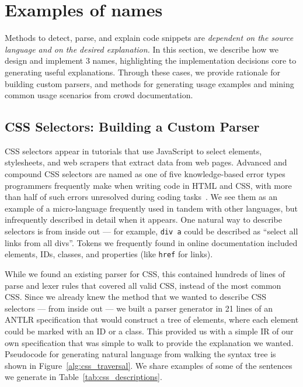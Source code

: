 \section{Examples of \Glspl{name}}

Methods to detect, parse, and explain code snippets are \emph{dependent on the source language and on the desired explanation.}
In this section, we describe how we design and implement 3 \glspl{name}, highlighting the implementation decisions core to generating useful explanations.
Through these cases, we provide rationale for building custom parsers, and methods for generating usage examples and mining common usage scenarios from crowd documentation.

\subsection{CSS Selectors: Building a Custom Parser}

CSS selectors appear in tutorials that use JavaScript to select elements, stylesheets, and web scrapers that extract data from web pages.
Advanced and compound CSS selectors are named as one of five knowledge-based error types programmers frequently make when writing code in HTML and CSS, with more than half of such errors unresolved during coding tasks~\cite{park_towards_2013}.
We see them as an example of a micro-language frequently used in tandem with other languages, but infrequently described in detail when it appears.
One natural way to describe selectors is from inside out --- for example, \texttt{div a} could be described as ``select all links from all divs''.
Tokens we frequently found in online documentation included elements, IDs, classes, and properties (like \texttt{href} for links).

While we found an existing parser for CSS, this contained hundreds of lines of parse and lexer rules that covered all valid CSS, instead of the most common CSS.
Since we already knew the method that we wanted to describe CSS selectors --- from inside out --- we built a parser generator in 21 lines of an ANTLR specification that would construct a tree of elements, where each element could be marked with an ID or a class.
This provided us with a simple IR of our own specification that was simple to walk to provide the explanation we wanted.
Pseudocode for generating natural language from walking the syntax tree is shown in Figure~\ref{alg:css_traversal}.
We share examples of some of the sentences we generate in Table~\ref{tab:css_descriptions}.

